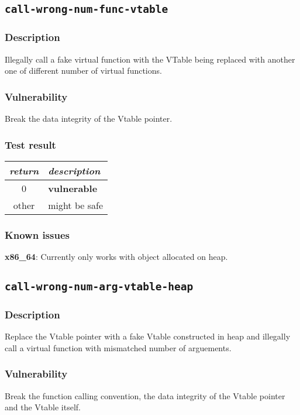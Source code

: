 \documentclass[a4paper]{book}
\begin{document}
\newpage
\subsection{\texttt{call-wrong-num-func-vtable}}\label{test-call-wrong-num-func-vtable}

\subsubsection{Description}
Illegally call a fake virtual function with the VTable being replaced with another one of different number of virtual functions.

\subsubsection{Vulnerability}
Break the data integrity of the Vtable pointer.

\subsubsection{Test result}
\begin{tabular}{cl}
  \toprule
  \emph{return}  & \emph{description} \\
  \midrule
  0              & \textbf{vulnerable} \\
  other          & might be safe \\
  \bottomrule
\end{tabular}

\subsubsection{Known issues}

\textbf{x86\_64}: Currently only works with object allocated on heap.

\newpage
\subsection{\texttt{call-wrong-num-arg-vtable-heap}}\label{test-call-wrong-num-arg-vtable-heap}

\subsubsection{Description}
Replace the Vtable pointer with a fake Vtable constructed in heap and
illegally call a virtual function with mismatched number of arguements.

\subsubsection{Vulnerability}
Break the function calling convention, the data integrity of the Vtable pointer and the Vtable itself.
\end{document}
